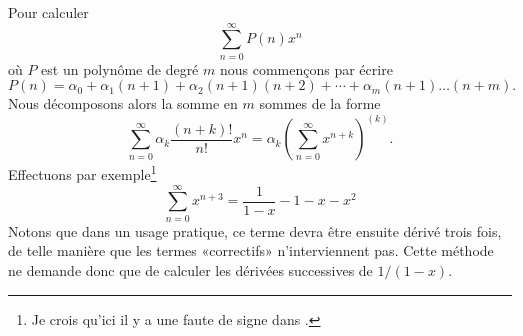 Pour calculer 
\begin{equation}
    \sum_{n=0}^{\infty}P(n)x^n
\end{equation}
où \( P\) est un polynôme de degré \( m\) nous commençons par écrire
\begin{equation}
    P(n)=\alpha_0+\alpha_1(n+1)+\alpha_2(n+1)(n+2)+\cdots +\alpha_m(n+1)\ldots (n+m).
\end{equation}
Nous décomposons alors la somme en \( m\) sommes de la forme
\begin{equation}
    \sum_{n=0}^{\infty}\alpha_k\frac{ (n+k)! }{ n! }x^n=\alpha_k\left( \sum_{n=0}^{\infty}x^{n+k} \right)^{(k)}.
\end{equation}
Effectuons par exemple\footnote{Je crois qu'ici il y a une faute de signe dans \cite{DAnSerEntiere}.}
\begin{equation}
    \sum_{n=0}^{\infty}x^{n+3}=\frac{1}{ 1-x }-1-x-x^2
\end{equation}
Notons que dans un usage pratique, ce terme devra être ensuite dérivé trois fois, de telle manière que les termes «correctifs» n'interviennent pas. Cette méthode ne demande donc que de calculer les dérivées successives de \( 1/(1-x)\).

